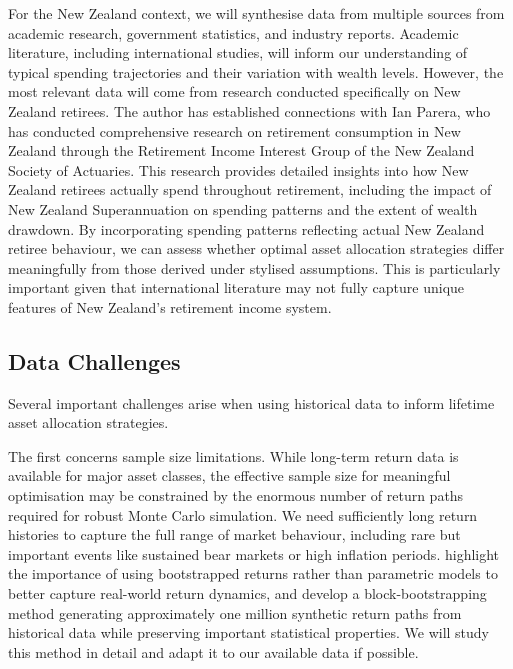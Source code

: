 \documentclass[11pt]{article}
\begin{document}
For the New Zealand context, we will synthesise data from multiple sources from academic research, government statistics, and industry reports. Academic literature, including international studies, will inform our understanding of typical spending trajectories and their variation with wealth levels. However, the most relevant data will come from research conducted specifically on New Zealand retirees. The author has established connections with Ian Parera, who has conducted comprehensive research on retirement consumption in New Zealand through the Retirement Income Interest Group of the New Zealand Society of Actuaries. This research provides detailed insights into how New Zealand retirees actually spend throughout retirement, including the impact of New Zealand Superannuation on spending patterns and the extent of wealth drawdown. By incorporating spending patterns reflecting actual New Zealand retiree behaviour, we can assess whether optimal asset allocation strategies differ meaningfully from those derived under stylised assumptions. This is particularly important given that international literature may not fully capture unique features of New Zealand's retirement income system.

\subsection{Data Challenges}

Several important challenges arise when using historical data to inform lifetime asset allocation strategies.

The first concerns sample size limitations. While long-term return data is available for major asset classes, the effective sample size for meaningful optimisation may be constrained by the enormous number of return paths required for robust Monte Carlo simulation. We need sufficiently long return histories to capture the full range of market behaviour, including rare but important events like sustained bear markets or high inflation periods. \textcite{anarkulova2025beyond} highlight the importance of using bootstrapped returns rather than parametric models to better capture real-world return dynamics, and develop a block-bootstrapping method generating approximately one million synthetic return paths from historical data while preserving important statistical properties. We will study this method in detail and adapt it to our available data if possible.
\end{document}
